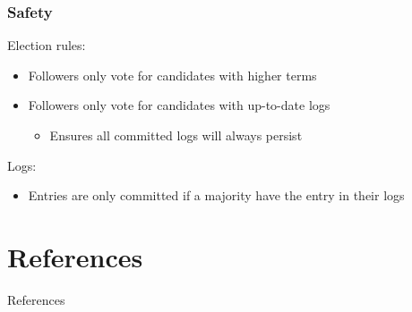 \documentclass[10pt]{beamer}
\begin{document}
\begin{frame}
  \frametitle{Safety}
  Election rules:
  \begin{itemize}
    \item Followers only vote for candidates with higher terms
    \item Followers only vote for candidates with up-to-date logs
    \begin{itemize}
      \item Ensures all committed logs will always persist
    \end{itemize}
  \end{itemize}
  
  Logs:
  \begin{itemize}
    \item Entries are only committed if a majority have the entry in their logs
  \end{itemize}

\end{frame}

\section{References}
\begin{frame}[allowframebreaks]{References}
  
  
\end{frame}
\end{document}
